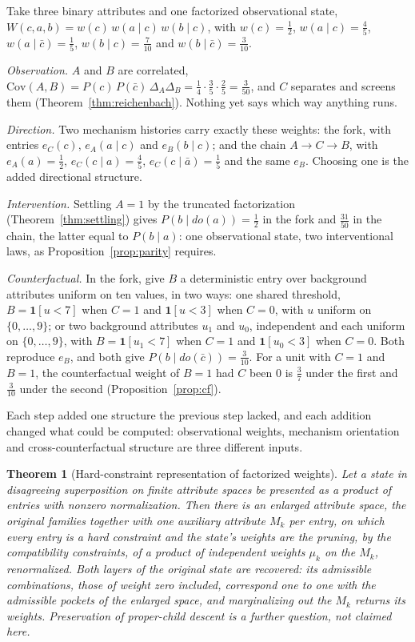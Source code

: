 \documentclass[11pt]{article}
\newtheorem{theorem}{Theorem}
\begin{document}
Take three binary attributes and one factorized observational state, $W(c, a, b) = w(c)\,w(a \mid c)\,w(b \mid c)$, with $w(c) = \tfrac12$, $w(a \mid c) = \tfrac45$, $w(a \mid \bar{c}) = \tfrac15$, $w(b \mid c) = \tfrac{7}{10}$ and $w(b \mid \bar{c}) = \tfrac{3}{10}$.

\textit{Observation.} $A$ and $B$ are correlated, $\mathrm{Cov}(A, B) = P(c)\,P(\bar{c})\,\Delta_A \Delta_B = \tfrac14 \cdot \tfrac35 \cdot \tfrac25 = \tfrac{3}{50}$, and $C$ separates and screens them (Theorem~\ref{thm:reichenbach}). Nothing yet says which way anything runs.

\textit{Direction.} Two mechanism histories carry exactly these weights: the fork, with entries $e_C(c)$, $e_A(a \mid c)$ and $e_B(b \mid c)$; and the chain $A \to C \to B$, with $e_A(a) = \tfrac12$, $e_C(c \mid a) = \tfrac45$, $e_C(c \mid \bar{a}) = \tfrac15$ and the same $e_B$. Choosing one is the added directional structure.

\textit{Intervention.} Settling $A = 1$ by the truncated factorization (Theorem~\ref{thm:settling}) gives $P(b \mid do(a)) = \tfrac12$ in the fork and $\tfrac{31}{50}$ in the chain, the latter equal to $P(b \mid a)$: one observational state, two interventional laws, as Proposition~\ref{prop:parity} requires.

\textit{Counterfactual.} In the fork, give $B$ a deterministic entry over background attributes uniform on ten values, in two ways: one shared threshold, $B = \mathbf{1}[u < 7]$ when $C = 1$ and $\mathbf{1}[u < 3]$ when $C = 0$, with $u$ uniform on $\{0, \ldots, 9\}$; or two background attributes $u_1$ and $u_0$, independent and each uniform on $\{0, \ldots, 9\}$, with $B = \mathbf{1}[u_1 < 7]$ when $C = 1$ and $\mathbf{1}[u_0 < 3]$ when $C = 0$. Both reproduce $e_B$, and both give $P(b \mid do(\bar{c})) = \tfrac{3}{10}$. For a unit with $C = 1$ and $B = 1$, the counterfactual weight of $B = 1$ had $C$ been $0$ is $\tfrac37$ under the first and $\tfrac{3}{10}$ under the second (Proposition~\ref{prop:cf}).

Each step added one structure the previous step lacked, and each addition changed what could be computed: observational weights, mechanism orientation and cross-counterfactual structure are three different inputs.

\begin{theorem}[Hard-constraint representation of factorized weights]\label{thm:snf}
Let a state in disagreeing superposition on finite attribute spaces be presented as a product of entries with nonzero normalization. Then there is an enlarged attribute space, the original families together with one auxiliary attribute $M_k$ per entry, on which every entry is a hard constraint and the state's weights are the pruning, by the compatibility constraints, of a product of independent weights $\mu_k$ on the $M_k$, renormalized. Both layers of the original state are recovered: its admissible combinations, those of weight zero included, correspond one to one with the admissible pockets of the enlarged space, and marginalizing out the $M_k$ returns its weights. Preservation of proper-child descent is a further question, not claimed here.
\end{theorem}
\end{document}
